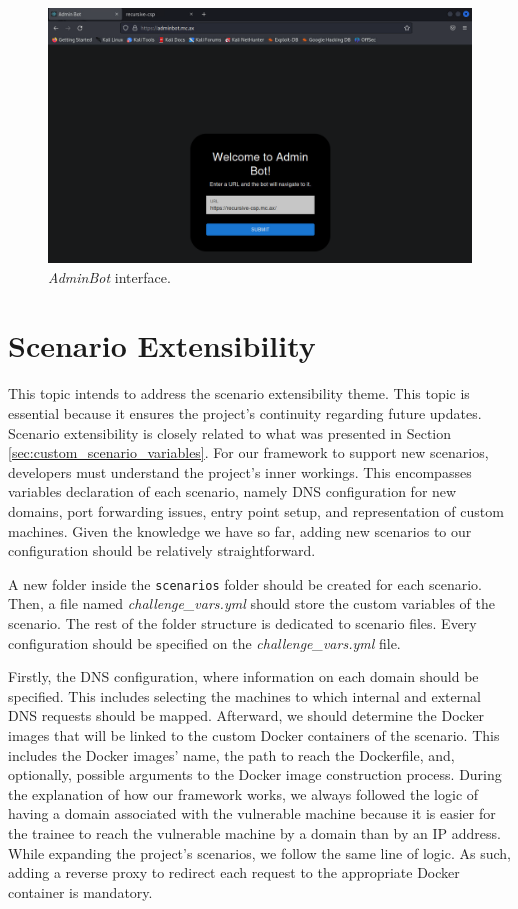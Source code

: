 \begin{figure}[H]
    \includegraphics[width=12cm]{figures/adminbot.png}
    \caption{\textit{AdminBot} interface.}
    \label{fig:template_net}
\end{figure}

\section{Scenario Extensibility} \label{sec:validation_scenario_extensibility}

This topic intends to address the scenario extensibility theme. This topic is essential because it ensures the project's continuity regarding future updates. Scenario extensibility is closely related to what was presented in Section \ref{sec:custom_scenario_variables}. For our framework to support new scenarios, developers must understand the project's inner workings. This encompasses variables declaration of each scenario, namely DNS configuration for new domains, port forwarding issues, entry point setup, and representation of custom machines. Given the knowledge we have so far, adding new scenarios to our configuration should be relatively straightforward. 

A new folder inside the \texttt{scenarios} folder should be created for each scenario. Then, a file named \textit{challenge\_vars.yml} should store the custom variables of the scenario. The rest of the folder structure is dedicated to scenario files. Every configuration should be specified on the \textit{challenge\_vars.yml} file.

Firstly, the DNS configuration, where information on each domain should be specified. This includes selecting the machines to which internal and external DNS requests should be mapped. Afterward, we should determine the Docker images that will be linked to the custom Docker containers of the scenario. This includes the Docker images' name, the path to reach the Dockerfile, and, optionally, possible arguments to the Docker image construction process. During the explanation of how our framework works, we always followed the logic of having a domain associated with the vulnerable machine because it is easier for the trainee to reach the vulnerable machine by a domain than by an IP address. While expanding the project's scenarios, we follow the same line of logic. As such, adding a reverse proxy to redirect each request to the appropriate Docker container is mandatory. 

